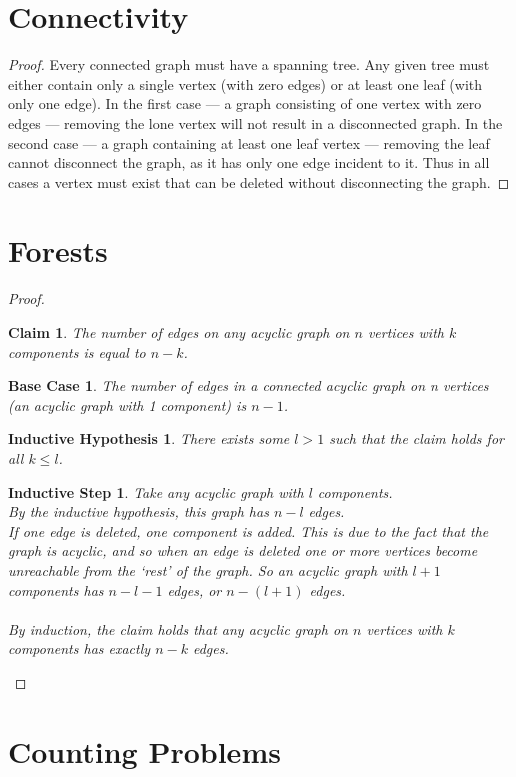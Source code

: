 \documentclass{article}
\newtheorem*{claim}{Claim}
\newtheorem*{base}{Base Case}
\newtheorem*{hypothesis}{Inductive Hypothesis}
\newtheorem*{step}{Inductive Step}
\begin{document}
\section{Connectivity}
\begin{proof}
	Every connected graph must have a spanning tree. Any given tree must either contain only a single vertex (with zero edges) or
	at least one leaf (with only one edge). In the first case --- a graph consisting of one vertex with zero edges
	--- removing the lone vertex will not result in a disconnected graph. In the second case --- a graph containing at
	least one leaf vertex --- removing the leaf cannot disconnect the graph, as it has only one edge incident to it.
	Thus in all cases a vertex must exist that can be deleted without disconnecting the graph.
\end{proof}
\section{Forests}
\begin{proof}
	\begin{claim}
		The number of edges on any acyclic graph on $n$ vertices with $k$ components is equal to $n-k$.
	\end{claim}
	\begin{base}
		The number of edges in a connected acyclic graph on n vertices (an acyclic graph with 1 component) is $n-1$.\\
	\end{base}
	\begin{hypothesis}
		There exists some $l>1$ such that the claim holds for all $k\le{l}$.
	\end{hypothesis}
	\begin{step}
		Take any acyclic graph with $l$ components.\\
		By the inductive hypothesis, this graph has $n-l$ edges.\\
		If one edge is deleted, one component is added. This is due to
		the fact that the graph is acyclic, and so when an edge is deleted one
		or more vertices become unreachable from the `rest' of the graph.
		So an acyclic graph with $l+1$ components has $n-l-1$ edges, or $n-(l+1)$ edges.\\\\
		By induction, the claim holds that any acyclic graph on $n$ vertices with $k$ components has exactly $n-k$ edges.
	\end{step}
\end{proof}
\section{Counting Problems}
\end{document}
